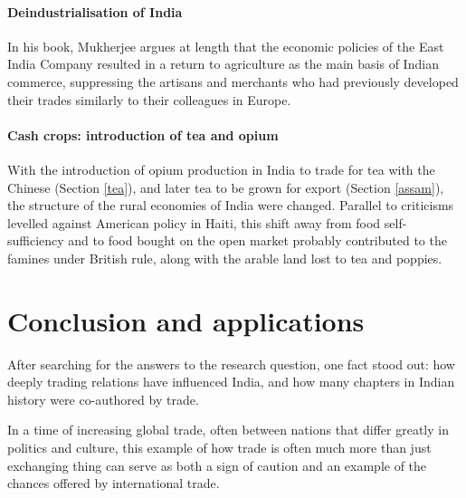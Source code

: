 \documentclass[11pt, a4paper, headings=standardclasses]{scrartcl}
\begin{document}
\paragraph{Deindustrialisation of India}

In his book, Mukherjee argues at length that the economic policies of the East India Company resulted in a return to agriculture as the main basis of Indian commerce, suppressing the artisans and merchants who had previously developed their trades similarly to their colleagues in Europe.\autocite[Chapter 5, Sections 1 and 2]{RF}

\paragraph{Cash crops: introduction of tea and opium}

With the introduction of opium production in India to trade for tea with the Chinese (Section \ref{tea}), and later tea to be grown for export (Section \ref{assam}), the structure of the rural economies of India were changed. Parallel to criticisms levelled against American policy in Haiti, this shift away from food self-sufficiency and to food bought on the open market probably contributed to the famines under British rule, along with the arable land lost to tea and poppies.

\section{Conclusion and applications}

After searching for the answers to the research question, one fact stood out: how deeply trading relations have influenced India, and how many chapters in Indian history were co-authored by trade.

In a time of increasing global trade, often between nations that differ greatly in politics and culture, this example of how trade is often much more than just exchanging thing can serve as both a sign of caution and an example of the chances offered by international trade.

\clearpage
\begin{singlespace}
\appendix
{}
\printbibliography
\end{singlespace}
\end{document}
